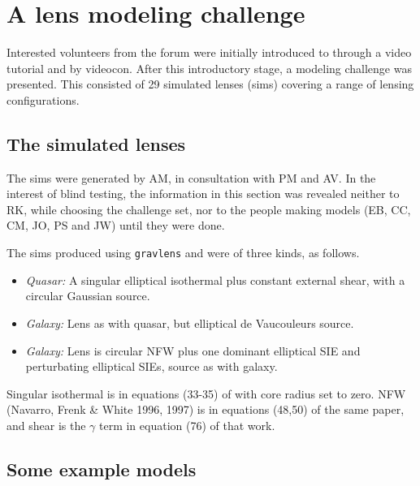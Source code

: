 \section{A lens modeling challenge} \label{sec:mod_challenge}


Interested volunteers from the \sw forum were initially introduced to
\spl through a video tutorial and by videocon.  After this
introductory stage, a modeling challenge was presented.  This
consisted of 29 simulated lenses (sims) covering a range of lensing
configurations.

\subsection{The simulated lenses} \label{sec:sims}

The sims were generated by AM, in consultation with PM and AV.  In the
interest of blind testing, the information in this section was
revealed neither to RK, while choosing the challenge set, nor to the
people making models (EB, CC, CM, JO, PS and JW) until they were done.

The sims produced using {\tt gravlens}
\citep{2001astro.ph..2341K,2001astro.ph..2340K} and were of three
kinds, as follows.

\begin{itemize}
  \item {\em Quasar:\/} A singular elliptical isothermal plus constant
    external shear, with a circular Gaussian source.
  \item {\em Galaxy:\/} Lens as with quasar, but elliptical de
    Vaucouleurs source.
  \item {\em Galaxy:\/} Lens is circular NFW plus one dominant
    elliptical SIE and perturbating elliptical SIEs, source as with
    galaxy.
\end{itemize}

Singular isothermal is in equations (33-35) of
\cite{2001astro.ph..2341K} with core radius set to zero. NFW (Navarro, Frenk & White 1996, 1997) is
in equations (48,50) of the same paper, and shear is the $\gamma$ term in
equation (76) of that work.

\subsection{Some example models} \label{sec:example_models}

